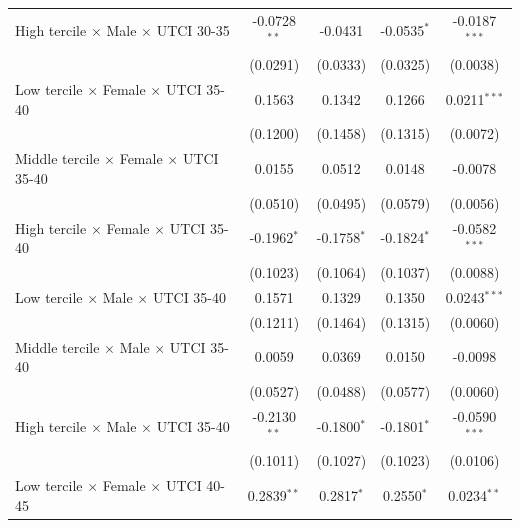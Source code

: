 \begin{table}[htbp]
\begin{tabular}{lcccc}
      High tercile $\times$ Male $\times$ UTCI 30-35       & -0.0728$^{**}$  & -0.0431             & -0.0535$^{*}$     & -0.0187$^{***}$\\   
                                                           & (0.0291)        & (0.0333)            & (0.0325)          & (0.0038)\\   
      Low tercile $\times$ Female $\times$ UTCI 35-40      & 0.1563          & 0.1342              & 0.1266            & 0.0211$^{***}$\\   
                                                           & (0.1200)        & (0.1458)            & (0.1315)          & (0.0072)\\   
      Middle tercile $\times$ Female $\times$ UTCI 35-40   & 0.0155          & 0.0512              & 0.0148            & -0.0078\\   
                                                           & (0.0510)        & (0.0495)            & (0.0579)          & (0.0056)\\   
      High tercile $\times$ Female $\times$ UTCI 35-40     & -0.1962$^{*}$   & -0.1758$^{*}$       & -0.1824$^{*}$     & -0.0582$^{***}$\\   
                                                           & (0.1023)        & (0.1064)            & (0.1037)          & (0.0088)\\   
      Low tercile $\times$ Male $\times$ UTCI 35-40        & 0.1571          & 0.1329              & 0.1350            & 0.0243$^{***}$\\   
                                                           & (0.1211)        & (0.1464)            & (0.1315)          & (0.0060)\\   
      Middle tercile $\times$ Male $\times$ UTCI 35-40     & 0.0059          & 0.0369              & 0.0150            & -0.0098\\   
                                                           & (0.0527)        & (0.0488)            & (0.0577)          & (0.0060)\\   
      High tercile $\times$ Male $\times$ UTCI 35-40       & -0.2130$^{**}$  & -0.1800$^{*}$       & -0.1801$^{*}$     & -0.0590$^{***}$\\   
                                                           & (0.1011)        & (0.1027)            & (0.1023)          & (0.0106)\\   
      Low tercile $\times$ Female $\times$ UTCI 40-45      & 0.2839$^{**}$   & 0.2817$^{*}$        & 0.2550$^{*}$      & 0.0234$^{**}$\\   

\end{tabular}
\end{table}
